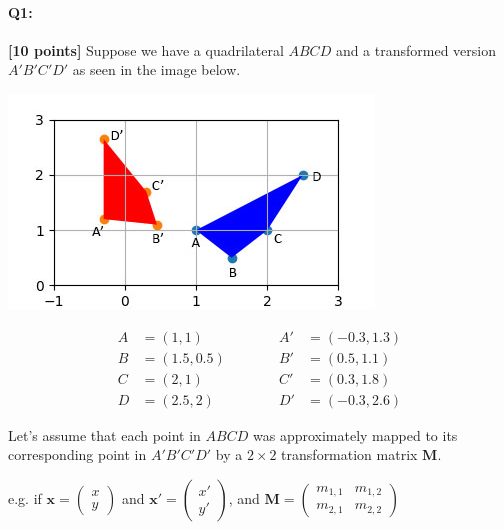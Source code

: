 \pagebreak


\paragraph{Q1:} \textbf{[10 points]}
Suppose we have a quadrilateral $ABCD$ and a transformed version $A'B'C'D'$ as seen in the image below.

\begin{minipage}{0.5\linewidth}
    \includegraphics[width=\linewidth]{images/quadrilaterals.jpg}
\end{minipage}
\begin{minipage}{0.5\linewidth}
    \begin{equation}
    \begin{split}
    A&=(1, 1)\\
    B&=(1.5, 0.5)\\
    C&=(2, 1)\\
    D&=(2.5, 2)
    \end{split}
    \quad\quad\quad
    \begin{split}
    A'&=(-0.3, 1.3)\\
    B'&=(0.5, 1.1)\\
    C'&=(0.3, 1.8)\\
    D'&=(-0.3, 2.6)
    \end{split}
    \end{equation}
\end{minipage}

Let's assume that each point in $ABCD$ was approximately mapped to its corresponding point in $A'B'C'D'$ by a $2\times2$ transformation matrix $\mathbf{M}$.

e.g. if $\mathbf{x} = \begin{pmatrix} x \\ y \end{pmatrix}$ and $\mathbf{x'} = \begin{pmatrix} x' \\ y' \end{pmatrix}$, and $\mathbf{M} = \begin{pmatrix} m_{1,1} & m_{1,2} \\ m_{2,1} & m_{2,2} \end{pmatrix}$

